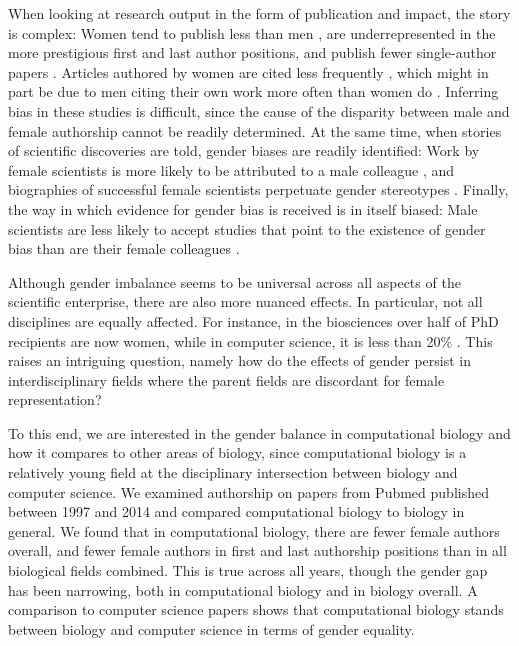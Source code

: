 \documentclass[10pt,letterpaper]{article}
\begin{document}
\begin{flushleft}
When looking at research output in the form of publication and impact, the story is complex: Women tend to publish less than men \cite{Lariviere2013}, are underrepresented in the more prestigious first and last author positions, and publish fewer single-author papers \cite{West2013}. Articles authored by women are cited less frequently \cite{Lariviere2013,Ghiasi2016}, which might in part be due to men citing their own work more often than women do \cite{King2016}. Inferring bias in these studies is difficult, since the cause of the disparity between male and female authorship cannot be readily determined. At the same time, when stories of scientific discoveries are told, gender biases are readily identified: Work by female scientists is more likely to be attributed to a male colleague \cite{Rossiter1993}, and biographies of successful female scientists perpetuate gender stereotypes \cite{Fara2013}. Finally, the way in which evidence for gender bias is received is in itself biased:  Male scientists are less likely to accept studies that point to the existence of gender bias than are their female colleagues \cite{Handley2015}.

Although gender imbalance seems to be universal across all aspects of the scientific enterprise, there are also more nuanced effects. In particular, not all disciplines are equally affected. For instance, in the biosciences over half of PhD recipients are now women, while in computer science, it is less than 20\% \cite{NSF2015}. This raises an intriguing question, namely how do the effects of gender persist in interdisciplinary fields where the parent fields are discordant for female representation?

To this end, we are interested in the gender balance in computational biology and how it compares to other areas of biology, since computational biology is a relatively young field at the disciplinary intersection between biology and computer science. We examined authorship on papers from Pubmed published between 1997 and 2014 and compared computational biology to biology in general. We found that in computational biology, there are fewer female authors overall, and fewer female authors in first and last authorship positions than in all biological fields combined. This is true across all years, though the gender gap has been narrowing, both in computational biology and in biology overall. A comparison to computer science papers shows that computational biology stands between biology and computer science in terms of gender equality.


\end{flushleft}
\end{document}
